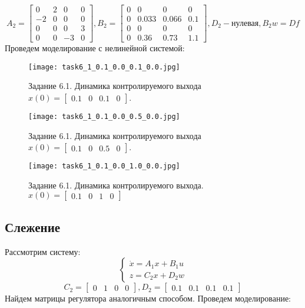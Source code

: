 \begin{equation*}
    A_2 = 
    \begin{bmatrix}
        0 & 2 & 0 & 0 \\
        -2 & 0 & 0 & 0 \\
        0 & 0 & 0 & 3 \\
        0 & 0 & -3 & 0
    \end{bmatrix},
    B_2 = 
    \begin{bmatrix}
        0 & 0 & 0 & 0 \\
        0 & 0.033 & 0.066 & 0.1 \\
        0 & 0 & 0 & 0 \\
        0 & 0.36 & 0.73 & 1.1 
    \end{bmatrix},
    D_2 - \text{нулевая},
    B_2w = Df
\end{equation*}
Проведем моделирование с нелинейной системой:
\begin{figure}[]
    \centering
    \texttt{[image: task6\_1\_0.1\_0.0\_0.1\_0.0.jpg]}
    \caption{Задание 6.1. Динамика контролируемого выхода $x(0) = \begin{bmatrix} 0.1 & 0 & 0.1 & 0 \end{bmatrix}$.}
    \label{fig:task6_1_1}
\end{figure}
\begin{figure}[]
    \centering
    \texttt{[image: task6\_1\_0.1\_0.0\_0.5\_0.0.jpg]}
    \caption{Задание 6.1. Динамика контролируемого выхода $x(0) = \begin{bmatrix} 0.1 & 0 & 0.5 & 0 \end{bmatrix}$.}
    \label{fig:task6_1_2}
\end{figure}
\begin{figure}[]
    \centering
    \texttt{[image: task6\_1\_0.1\_0.0\_1.0\_0.0.jpg]}
    \caption{Задание 6.1. Динамика контролируемого выхода. $x(0) = \begin{bmatrix} 0.1 & 0 & 1 & 0 \end{bmatrix}$}
    \label{fig:task6_1_3}
\end{figure}

\subsection{Слежение}
Рассмотрим систему:
\begin{equation}
    \begin{cases}
        \dot{x} = A_1x + B_1u \\
        z = C_2x + D_2w
    \end{cases}
\end{equation}
\begin{equation*}
    C_2 = \begin{bmatrix}
        0 & 1 & 0 & 0
    \end{bmatrix},
    D_2 = \begin{bmatrix}
        0.1 & 0.1 & 0.1 & 0.1
    \end{bmatrix}
\end{equation*}
Найдем матрицы регулятора аналогичным способом.
Проведем моделирование:

